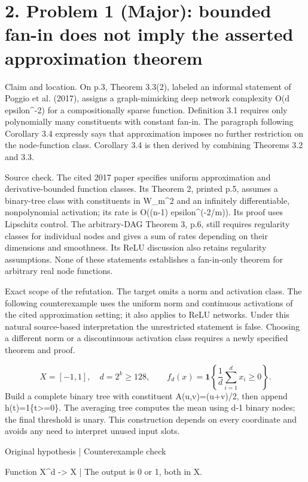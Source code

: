 \documentclass[10pt]{article}
\begin{document}
\section*{2. Problem 1 (Major): bounded fan-in does not imply the asserted approximation theorem}
Claim and location. On p.3, Theorem 3.3(2), labeled an informal statement of Poggio et al. (2017), assigns a graph-mimicking deep network complexity O(d epsilon\textasciicircum{}-2) for a compositionally sparse function. Definition 3.1 requires only polynomially many constituents with constant fan-in. The paragraph following Corollary 3.4 expressly says that approximation imposes no further restriction on the node-function class. Corollary 3.4 is then derived by combining Theorems 3.2 and 3.3.\par
Source check. The cited 2017 paper specifies uniform approximation and derivative-bounded function classes. Its Theorem 2, printed p.5, assumes a binary-tree class with constituents in W\_m\textasciicircum{}2 and an infinitely differentiable, nonpolynomial activation; its rate is O((n-1) epsilon\textasciicircum{}(-2/m)). Its proof uses Lipschitz control. The arbitrary-DAG Theorem 3, p.6, still requires regularity classes for individual nodes and gives a sum of rates depending on their dimensions and smoothness. Its ReLU discussion also retains regularity assumptions. None of these statements establishes a fan-in-only theorem for arbitrary real node functions.\par
Exact scope of the refutation. The target omits a norm and activation class. The following counterexample uses the uniform norm and continuous activations of the cited approximation setting; it also applies to ReLU networks. Under this natural source-based interpretation the unrestricted statement is false. Choosing a different norm or a discontinuous activation class requires a newly specified theorem and proof.\par
\[X=[-1,1],\quad d=2^k\geq128,\qquad
f_d(x)=\mathbf{1}\!\left\{\frac{1}{d}\sum_{i=1}^{d}x_i\geq0\right\}.\] Build a complete binary tree with constituent A(u,v)=(u+v)/2, then append h(t)=1\{t>=0\}. The averaging tree computes the mean using d-1 binary nodes; the final threshold is unary. This construction depends on every coordinate and avoids any need to interpret unused input slots.\par
Original hypothesis | Counterexample check\par
Function X\textasciicircum{}d -> X | The output is 0 or 1, both in X.\par
\end{document}
